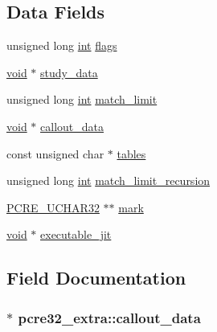 \subsection*{Data Fields}
\begin{DoxyCompactItemize}
\item 
unsigned long \hyperlink{pcre_8txt_a42dfa4ff673c82d8efe7144098fbc198}{int} \hyperlink{structpcre32__extra_a4f2f0985060836804aa6f8ac578eec55}{flags}
\item 
\hyperlink{group__MOD__ISAPI_gacd6cdbf73df3d9eed42fa493d9b621a6}{void} $\ast$ \hyperlink{structpcre32__extra_ae1b1101191398f67e49484c786d7d884}{study\+\_\+data}
\item 
unsigned long \hyperlink{pcre_8txt_a42dfa4ff673c82d8efe7144098fbc198}{int} \hyperlink{structpcre32__extra_af0ff51e4e354069a85acdadd0856aa91}{match\+\_\+limit}
\item 
\hyperlink{group__MOD__ISAPI_gacd6cdbf73df3d9eed42fa493d9b621a6}{void} $\ast$ \hyperlink{structpcre32__extra_ab9710dc6a854e5d2a4dc8738bee5a3ff}{callout\+\_\+data}
\item 
const unsigned char $\ast$ \hyperlink{structpcre32__extra_ae0db073839dce942e0e54b9de6a0dcbf}{tables}
\item 
unsigned long \hyperlink{pcre_8txt_a42dfa4ff673c82d8efe7144098fbc198}{int} \hyperlink{structpcre32__extra_afe43ae2066f358fda83cb52205d56c0b}{match\+\_\+limit\+\_\+recursion}
\item 
\hyperlink{pcre_8h_a6d715696d8ebf9818e79d3ecc08e4b2f}{P\+C\+R\+E\+\_\+\+U\+C\+H\+A\+R32} $\ast$$\ast$ \hyperlink{structpcre32__extra_aaca66fdb0ed19effcdc2160fac33e5e5}{mark}
\item 
\hyperlink{group__MOD__ISAPI_gacd6cdbf73df3d9eed42fa493d9b621a6}{void} $\ast$ \hyperlink{structpcre32__extra_ab6c1e4dfd3f9774d9d100934c72c3cf8}{executable\+\_\+jit}
\end{DoxyCompactItemize}


\subsection{Field Documentation}
\subsubsection[{\texorpdfstring{callout\+\_\+data}{callout_data}}]{$\ast$ pcre32\+\_\+extra\+::callout\+\_\+data}\hypertarget{structpcre32__extra_ab9710dc6a854e5d2a4dc8738bee5a3ff}{}\label{structpcre32__extra_ab9710dc6a854e5d2a4dc8738bee5a3ff}
